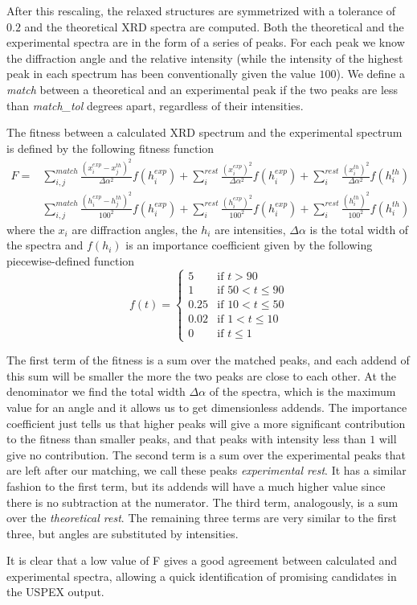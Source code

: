 \documentclass{article}
\begin{document}
After this rescaling, the relaxed structures are symmetrized with a tolerance of $0.2$ and the theoretical XRD spectra are computed. Both the theoretical and the experimental spectra are in the form of a series of peaks. For each peak we know the diffraction angle and the relative intensity (while the intensity of the highest peak in each spectrum has been conventionally given the value $100$). We define a \emph{match} between a theoretical and an experimental peak if the two peaks are less than \emph{match\_tol} degrees apart, regardless of their intensities.

The fitness between a calculated XRD spectrum and the experimental spectrum is defined by the following fitness function
\begin{align*}
	F = &\sum_{i, j}^{match} \frac{(x_i^{exp} - x_j^{th})^2}{\Delta \alpha^2} f(h_i^{exp}) + \sum_i^{rest} \frac{(x_i^{exp})^2}{\Delta \alpha^2} f(h_i^{exp}) + \sum_i^{rest} \frac{(x_i^{th})^2}{\Delta \alpha^2} f(h_i^{th}) \\
	&\sum_{i, j}^{match} \frac{(h_i^{exp} - h_j^{th})^2}{100^2} f(h_i^{exp}) + \sum_i^{rest} \frac{(h_i^{exp})^2}{100^2} f(h_i^{exp}) + \sum_i^{rest} \frac{(h_i^{th})^2}{100^2} f(h_i^{th})
\end{align*}
where the $x_i$ are diffraction angles, the $h_i$ are intensities, $\Delta \alpha$ is the total width of the spectra and $f(h_i)$ is an importance coefficient given by the following piecewise-defined function
\begin{equation*}
	f(t)=
	\begin{cases}
		5 & \text{if $t > 90$} \\
		1 & \text{if $50 < t \le 90$} \\
		0.25 & \text{if $10 < t \le 50$} \\
		0.02 & \text{if $1 < t \le 10$} \\
		0 & \text{if $t \le 1$}
	\end{cases}
\end{equation*}

The first term of the fitness is a sum over the matched peaks, and each addend of this sum will be smaller the more the two peaks are close to each other. At the denominator we find the total width $\Delta \alpha$ of the spectra, which is the maximum value for an angle and it allows us to get dimensionless addends. The importance coefficient just tells us that higher peaks will give a more significant contribution to the fitness than smaller peaks, and that peaks with intensity less than $1$ will give no contribution. The second term is a sum over the experimental peaks that are left after our matching, we call these peaks \emph{experimental rest}. It has a similar fashion to the first term, but its addends will have a much higher value since there is no subtraction at the numerator. The third term, analogously, is a sum over the \emph{theoretical rest}. The remaining three terms are very similar to the first three, but angles are substituted by intensities.

It is clear that a low value of F gives a good agreement between calculated and experimental spectra, allowing a quick identification of promising candidates in the USPEX output.
\end{document}
